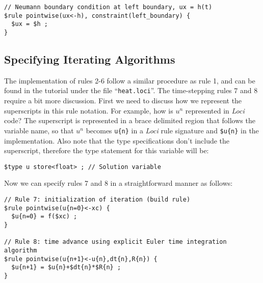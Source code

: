 \documentclass[10pt,epsf,letterpaper,twoside]{book}
\begin{document}
\begin{verbatim}
// Neumann boundary condition at left boundary, ux = h(t)
$rule pointwise(ux<-h), constraint(left_boundary) {
  $ux = $h ;
}
\end{verbatim}

\subsection{Specifying Iterating Algorithms}
The implementation of rules 2-6 follow a similar procedure as rule 1,
and can be found in the tutorial under the file ``{\tt heat.loci}''.
The time-stepping rules 7 and 8 require a bit more discussion.  First
we need to discuss how we represent the superscripts in this rule
notation.  For example, how is $u^n$ represented in {\it Loci} code?  The
superscript is represented in a brace delimited region that follows the
variable name, so that $u^n$ becomes {\tt u\{n\}} in a {\it Loci} rule
signature and {\tt \$u\{n\}} in the implementation. Also note that the
type specifications don't include the superscript, therefore the type
statement for this variable will be:
\begin{verbatim}
$type u store<float> ; // Solution variable
\end{verbatim}

Now we can specify rules 7 and 8 in a straightforward manner as follows:
\begin{verbatim}
// Rule 7: initialization of iteration (build rule)
$rule pointwise(u{n=0}<-xc) {
  $u{n=0} = f($xc) ;
}

// Rule 8: time advance using explicit Euler time integration algorithm
$rule pointwise(u{n+1}<-u{n},dt{n},R{n}) {
  $u{n+1} = $u{n}+$dt{n}*$R{n} ;
}
\end{verbatim}
\end{document}
